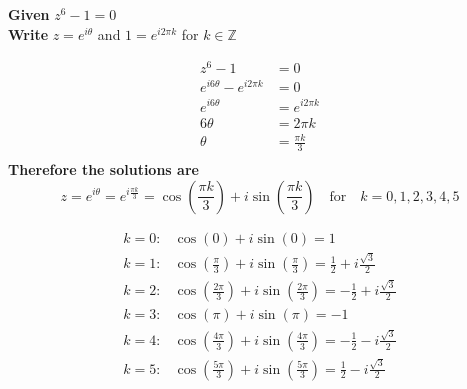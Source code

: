 \documentclass[a4paper, 8pt]{extarticle}
\begin{document}
\begin{examplebox}[Determine all solutions to $z^6 -1 = 0$ and factor $x^6-1$ as a product of linear and quadratic factors]
    \label{sol:2023Q1b}
    \textbf{Given} $z^6 -1 = 0$ \\
    \textbf{Write} $z = e^{i \theta}$ and $1 = e^{i 2 \pi k}$ for $k \in \mathbb{Z}$

    \begin{align*}
        z^6 -1                         & = 0               \\
        e^{i 6 \theta} - e^{i 2 \pi k} & = 0               \\
        e^{i 6 \theta}                 & = e^{i 2 \pi k}   \\
        6 \theta                       & = 2 \pi k         \\
        \theta                         & = \frac{\pi k}{3} \\
    \end{align*}
    \textbf{Therefore the solutions are}
    $$z = e^{i \theta} = e^{i \frac{\pi k}{3}} = \cos\left(\frac{\pi k}{3}\right) + i\sin\left(\frac{\pi k}{3}\right) \quad \text{for} \quad k = 0, 1, 2, 3, 4, 5$$
    \begin{minipage}{0.49\textwidth}
        \begin{align*}
            k = 0 : & \cos(0) + i\sin(0)                         = 1                                                          \\
            k = 1 : & \cos\left(\frac{\pi}{3}\right) + i\sin\left(\frac{\pi}{3}\right)    = \frac{1}{2} + i\frac{\sqrt{3}}{2} \\
            k = 2 : & \cos\left(\frac{2\pi}{3}\right) + i\sin\left(\frac{2\pi}{3}\right) = -\frac{1}{2} + i\frac{\sqrt{3}}{2} \\
            k = 3 : & \cos\left(\pi\right) + i\sin\left(\pi\right)                        = -1                                \\
            k = 4 : & \cos\left(\frac{4\pi}{3}\right) + i\sin\left(\frac{4\pi}{3}\right) = -\frac{1}{2} - i\frac{\sqrt{3}}{2} \\
            k = 5 : & \cos\left(\frac{5\pi}{3}\right) + i\sin\left(\frac{5\pi}{3}\right) = \frac{1}{2} - i\frac{\sqrt{3}}{2}  \\
        \end{align*}
    \end{minipage}

\end{examplebox}
\end{document}
